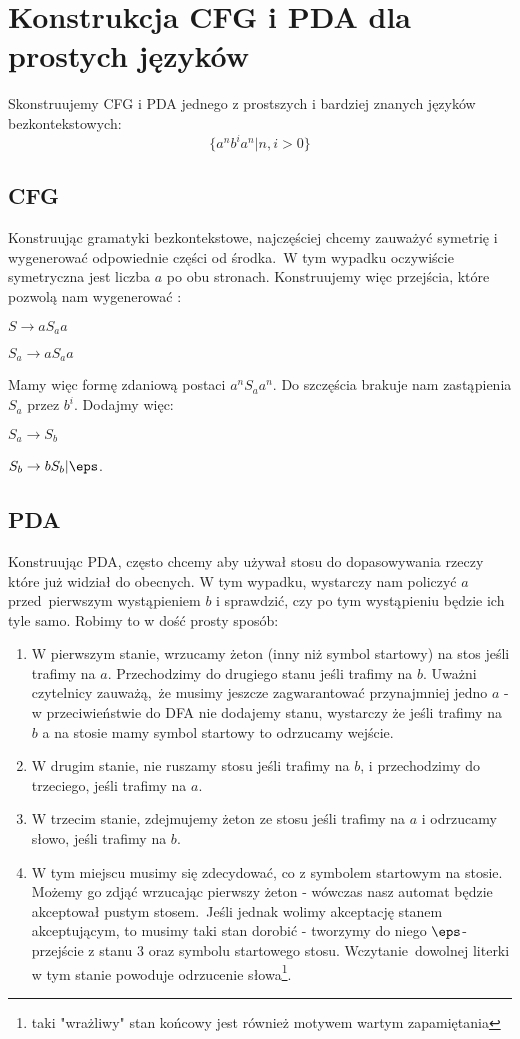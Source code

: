 \section{Konstrukcja CFG i PDA dla prostych języków}
\label{example-cfg-pda}

Skonstruujemy CFG i PDA jednego z prostszych i bardziej znanych języków bezkontekstowych:
\[
    \{ a^nb^ia^n | n, i > 0 \}
\]

\subsection{CFG}

Konstruując gramatyki bezkontekstowe, najczęściej chcemy zauważyć symetrię i wygenerować odpowiednie części od środka.\
W tym wypadku oczywiście symetryczna jest liczba \(a\) po obu stronach. Konstruujemy więc przejścia, które pozwolą nam wygenerować :

\(S \rightarrow aS_aa\)

\(S_a \rightarrow aS_aa\)

Mamy więc formę zdaniową postaci \(a^nS_aa^n\). Do szczęścia brakuje nam zastąpienia \(S_a\) przez  \(b^i\). Dodajmy więc:

\(S_a \rightarrow S_b\)

\(S_b \rightarrow bS_b | \eps\).

\subsection{PDA}

Konstruując PDA, często chcemy aby używał stosu do dopasowywania rzeczy które już widział do obecnych. W tym wypadku, wystarczy nam policzyć \(a\) przed\
pierwszym wystąpieniem \(b\) i sprawdzić, czy po tym wystąpieniu będzie ich tyle samo. Robimy to w dość prosty sposób:

\begin{enumerate}
    \item W pierwszym stanie, wrzucamy żeton (inny niż symbol startowy) na stos jeśli trafimy na \(a\). Przechodzimy do drugiego stanu jeśli trafimy na \(b\). Uważni czytelnicy zauważą,\
    że musimy jeszcze zagwarantować przynajmniej jedno \(a\) - w przeciwieństwie do DFA nie dodajemy stanu, wystarczy że jeśli trafimy na \(b\) a na stosie mamy symbol startowy to odrzucamy wejście.
    \item W drugim stanie, nie ruszamy stosu jeśli trafimy na \(b\), i przechodzimy do trzeciego, jeśli trafimy na \(a\).
    \item W trzecim stanie, zdejmujemy żeton ze stosu jeśli trafimy na \(a\) i odrzucamy słowo, jeśli trafimy na \(b\).
    \item W tym miejscu musimy się zdecydować, co z symbolem startowym na stosie. Możemy go zdjąć wrzucając pierwszy żeton - wówczas nasz automat będzie akceptował pustym stosem.\
    Jeśli jednak wolimy akceptację stanem akceptującym, to musimy taki stan dorobić - tworzymy do niego \(\eps\)-przejście z stanu 3 oraz symbolu startowego stosu. Wczytanie\
    dowolnej literki w tym stanie powoduje odrzucenie słowa\footnote{taki "wrażliwy" stan końcowy jest również motywem wartym zapamiętania}.
\end{enumerate}
